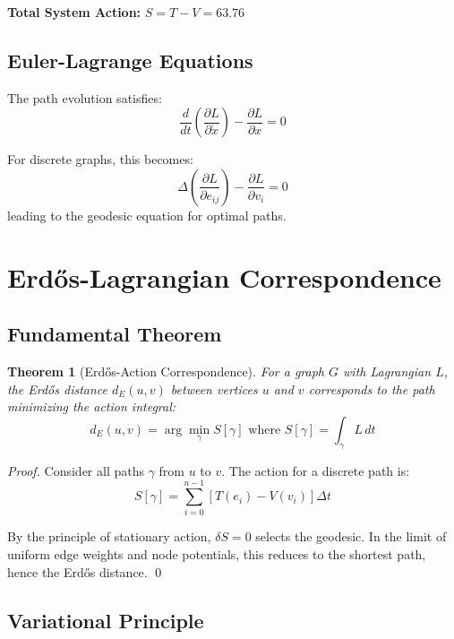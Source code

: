 \documentclass[12pt,a4paper]{article}
\newtheorem{theorem}{Theorem}
\begin{document}
\textbf{Total System Action:} $S = T - V = 63.76$

\subsection{Euler-Lagrange Equations}

The path evolution satisfies:
\begin{equation}
\frac{d}{dt}\left(\frac{\partial L}{\partial \dot{x}}\right) - \frac{\partial L}{\partial x} = 0
\end{equation}

For discrete graphs, this becomes:
\begin{equation}
\Delta\left(\frac{\partial L}{\partial e_{ij}}\right) - \frac{\partial L}{\partial v_i} = 0
\end{equation}
leading to the geodesic equation for optimal paths.

\section{Erdős-Lagrangian Correspondence}

\subsection{Fundamental Theorem}

\begin{theorem}[Erdős-Action Correspondence]
For a graph $G$ with Lagrangian $L$, the Erdős distance $d_E(u,v)$ between vertices $u$ and $v$ corresponds to the path minimizing the action integral:
\begin{equation}
d_E(u,v) = \arg\min_{\gamma} S[\gamma] \text{ where } S[\gamma] = \int_{\gamma} L \, dt
\end{equation}
\end{theorem}

\begin{proof}
Consider all paths $\gamma$ from $u$ to $v$. The action for a discrete path is:
\begin{equation}
S[\gamma] = \sum_{i=0}^{n-1} [T(e_i) - V(v_i)]\Delta t
\end{equation}

By the principle of stationary action, $\delta S = 0$ selects the geodesic. In the limit of uniform edge weights and node potentials, this reduces to the shortest path, hence the Erdős distance. \qed
\end{proof}

\subsection{Variational Principle}
\end{document}
